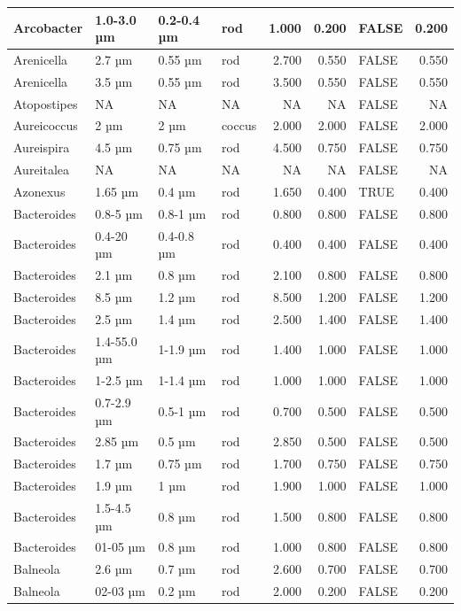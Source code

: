 \documentclass[
]{article}
\begin{document}
\begin{table}
\begin{tabular}{l|l|l|l|r|r|l|r}
\hline
Arcobacter & 1.0-3.0 µm & 0.2-0.4 µm & rod & 1.000 & 0.200 & FALSE & 0.200\\
\hline
Arenicella & 2.7 µm & 0.55 µm & rod & 2.700 & 0.550 & FALSE & 0.550\\
\hline
Arenicella & 3.5 µm & 0.55 µm & rod & 3.500 & 0.550 & FALSE & 0.550\\
\hline
Atopostipes & NA & NA & NA & NA & NA & FALSE & NA\\
\hline
Aureicoccus & 2 µm & 2 µm & coccus & 2.000 & 2.000 & FALSE & 2.000\\
\hline
Aureispira & 4.5 µm & 0.75 µm & rod & 4.500 & 0.750 & FALSE & 0.750\\
\hline
Aureitalea & NA & NA & NA & NA & NA & FALSE & NA\\
\hline
Azonexus & 1.65 µm & 0.4 µm & rod & 1.650 & 0.400 & TRUE & 0.400\\
\hline
Bacteroides & 0.8-5 µm & 0.8-1 µm & rod & 0.800 & 0.800 & FALSE & 0.800\\
\hline
Bacteroides & 0.4-20 µm & 0.4-0.8 µm & rod & 0.400 & 0.400 & FALSE & 0.400\\
\hline
Bacteroides & 2.1 µm & 0.8 µm & rod & 2.100 & 0.800 & FALSE & 0.800\\
\hline
Bacteroides & 8.5 µm & 1.2 µm & rod & 8.500 & 1.200 & FALSE & 1.200\\
\hline
Bacteroides & 2.5 µm & 1.4 µm & rod & 2.500 & 1.400 & FALSE & 1.400\\
\hline
Bacteroides & 1.4-55.0 µm & 1-1.9 µm & rod & 1.400 & 1.000 & FALSE & 1.000\\
\hline
Bacteroides & 1-2.5 µm & 1-1.4 µm & rod & 1.000 & 1.000 & FALSE & 1.000\\
\hline
Bacteroides & 0.7-2.9 µm & 0.5-1 µm & rod & 0.700 & 0.500 & FALSE & 0.500\\
\hline
Bacteroides & 2.85 µm & 0.5 µm & rod & 2.850 & 0.500 & FALSE & 0.500\\
\hline
Bacteroides & 1.7 µm & 0.75 µm & rod & 1.700 & 0.750 & FALSE & 0.750\\
\hline
Bacteroides & 1.9 µm & 1 µm & rod & 1.900 & 1.000 & FALSE & 1.000\\
\hline
Bacteroides & 1.5-4.5 µm & 0.8 µm & rod & 1.500 & 0.800 & FALSE & 0.800\\
\hline
Bacteroides & 01-05 µm & 0.8 µm & rod & 1.000 & 0.800 & FALSE & 0.800\\
\hline
Balneola & 2.6 µm & 0.7 µm & rod & 2.600 & 0.700 & FALSE & 0.700\\
\hline
Balneola & 02-03 µm & 0.2 µm & rod & 2.000 & 0.200 & FALSE & 0.200\\

\end{tabular}
\end{table}
\end{document}
